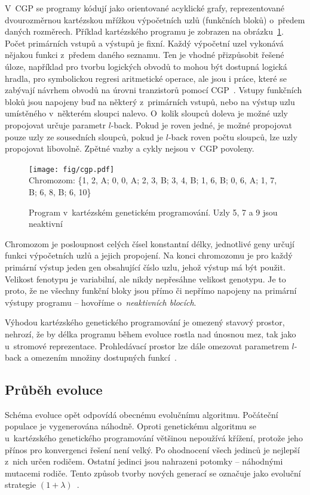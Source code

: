 V~CGP se programy kódují jako orientované acyklické grafy, reprezentované dvourozměrnou kartézskou mřížkou výpočetních uzlů (funkčních bloků) o~předem daných rozměrech. Příklad kartézského programu je zobrazen na obrázku~\ref{obrCGP}. Počet primárních vstupů a výstupů je fixní. Každý výpočetní uzel vykonává nějakou funkci z~předem daného seznamu. Ten je vhodné přizpůsobit řešené úloze, například pro tvorbu logických obvodů to mohou být dostupná logická hradla, pro symbolickou regresi aritmetické operace, ale jsou i práce, které se zabývají návrhem obvodů na úrovni tranzistorů pomocí CGP~\cite{Mrazek}. Vstupy funkčních bloků jsou napojeny buď na některý z~primárních vstupů, nebo na výstup uzlu umístěného v~některém sloupci nalevo. O~kolik sloupců doleva je možné uzly propojovat určuje parametr $l$-back. Pokud je roven jedné, je možné propojovat pouze uzly ze sousedních sloupců, pokud je $l$-back roven počtu sloupců, lze uzly propojovat libovolně. Zpětné vazby a cykly nejsou v~CGP povoleny.

\begin{figure}[htb]
    \centering\texttt{[image: fig/cgp.pdf]} \\
    {\scriptsize{}Chromozom: \{1, 2, A; 0, 0, A; 2, 3, B; 3, 4, B; 1, 6, B; 0, 6, A; 1, 7, B; 6, 8, B; 6, 10\}}
    \caption{Program v~kartézském genetickém programování. Uzly 5, 7 a 9 jsou neaktivní}
    \label{obrCGP}
\end{figure}

Chromozom je posloupnost celých čísel konstantní délky, jednotlivé geny určují funkci výpočetních uzlů a jejich propojení. Na konci chromozomu je pro každý primární výstup jeden gen obsahující číslo uzlu, jehož výstup má být použit. Velikost fenotypu je variabilní, ale nikdy nepřesáhne velikost genotypu. Je to proto, že ne všechny funkční bloky jsou přímo či nepřímo napojeny na primární výstupy programu -- hovoříme o~\emph{neaktivních blocích}.

Výhodou kartézského genetického programování je omezený stavový prostor, nehrozí, že by délka programu během evoluce rostla nad únosnou mez, tak jako u~stromové reprezentace. Prohledávací prostor lze dále omezovat parametrem $l$-back a omezením množiny dostupných funkcí~\cite{ZelenaCGP, Modra, HandbookGP}.

\subsection{Průběh evoluce}
\label{secCGPEvo}

Schéma evoluce opět odpovídá obecnému evolučnímu algoritmu. Počáteční populace je vygenerována náhodně. Oproti genetickému algoritmu se u~kartézského genetického programování většinou nepoužívá křížení, protože jeho přínos pro konvergenci řešení není velký. Po ohodnocení všech jedinců je nejlepší z~nich určen rodičem. Ostatní jedinci jsou nahrazeni potomky -- náhodnými mutacemi rodiče. Tento způsob tvorby nových generací se označuje jako evoluční strategie $(1 + \lambda)$~\cite{Modra}.

